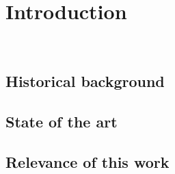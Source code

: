 \chapter{Introduction}\label{chap:intro}
\etocsettocstyle{\section*{\contentsname}}{}
\localtableofcontents\
\section{Historical background}
\section{State of the art}
\section{Relevance of this work}
 